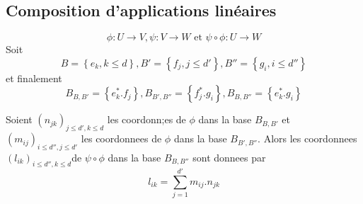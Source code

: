 \documentclass[../main.tex]{subfiles}
\begin{document}
\subsection{Composition d'applications linéaires}
\[ 
\phi: U \to V, \psi: V \to W \text{ et } \psi \circ \phi: U \to W
\]
Soit 
 \[ 
B = \left\{ e_k, k \leq d \right\} , B' = \left\{ f_j, j \leq d' \right\}, B'' = \left\{ g_i, i \leq d'' \right\} 
\]
et finalement
\[ 
	B_{B,B'} = \left\{ e_k^{*}. f_j \right\}, B_{B',B''}  = \left\{ f_j^{*}.g_i \right\} , B_{B,B''} = \left\{ e_k^{*}.g_i \right\} 
\]
\begin{thm}
	Soient $( n_{jk} ) _{j\leq d', k \leq d} $ les coordonn;es de $\phi$ dans la base $B_{B,B'} $ et $( m_{ij} ) _{i\leq d'', j \leq d'} $ les coordonnees de $\phi$ dans la base $B_{B',B''} $. Alors les coordonnees $( l_{ik} )_{i\leq d'', k \leq d}$de $\psi\circ \phi$ dans la base $B_{B,B''} $ sont donnees par
	\[ 
	l_{ik} = \sum_{j=1}^{ d'} m_{ij} . n_{jk} 
	\]
	
\end{thm}
\end{document}
